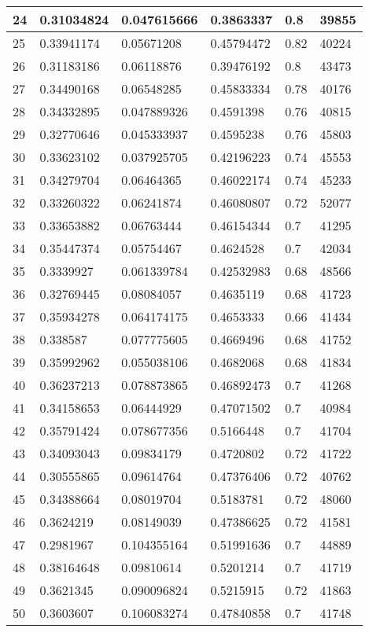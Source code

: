 \begin{longtable}{|l|l|l|l|l|l|}
24 & 0.31034824 & 0.047615666 & 0.3863337 & 0.8 & 39855 \\ \hline 
25 & 0.33941174 & 0.05671208 & 0.45794472 & 0.82 & 40224 \\ \hline 
26 & 0.31183186 & 0.06118876 & 0.39476192 & 0.8 & 43473 \\ \hline 
27 & 0.34490168 & 0.06548285 & 0.45833334 & 0.78 & 40176 \\ \hline 
28 & 0.34332895 & 0.047889326 & 0.4591398 & 0.76 & 40815 \\ \hline 
29 & 0.32770646 & 0.045333937 & 0.4595238 & 0.76 & 45803 \\ \hline 
30 & 0.33623102 & 0.037925705 & 0.42196223 & 0.74 & 45553 \\ \hline 
31 & 0.34279704 & 0.06464365 & 0.46022174 & 0.74 & 45233 \\ \hline 
32 & 0.33260322 & 0.06241874 & 0.46080807 & 0.72 & 52077 \\ \hline 
33 & 0.33653882 & 0.06763444 & 0.46154344 & 0.7 & 41295 \\ \hline 
34 & 0.35447374 & 0.05754467 & 0.4624528 & 0.7 & 42034 \\ \hline 
35 & 0.3339927 & 0.061339784 & 0.42532983 & 0.68 & 48566 \\ \hline 
36 & 0.32769445 & 0.08084057 & 0.4635119 & 0.68 & 41723 \\ \hline 
37 & 0.35934278 & 0.064174175 & 0.4653333 & 0.66 & 41434 \\ \hline 
38 & 0.338587 & 0.077775605 & 0.4669496 & 0.68 & 41752 \\ \hline 
39 & 0.35992962 & 0.055038106 & 0.4682068 & 0.68 & 41834 \\ \hline 
40 & 0.36237213 & 0.078873865 & 0.46892473 & 0.7 & 41268 \\ \hline 
41 & 0.34158653 & 0.06444929 & 0.47071502 & 0.7 & 40984 \\ \hline 
42 & 0.35791424 & 0.078677356 & 0.5166448 & 0.7 & 41704 \\ \hline 
43 & 0.34093043 & 0.09834179 & 0.4720802 & 0.72 & 41722 \\ \hline 
44 & 0.30555865 & 0.09614764 & 0.47376406 & 0.72 & 40762 \\ \hline 
45 & 0.34388664 & 0.08019704 & 0.5183781 & 0.72 & 48060 \\ \hline 
46 & 0.3624219 & 0.08149039 & 0.47386625 & 0.72 & 41581 \\ \hline 
47 & 0.2981967 & 0.104355164 & 0.51991636 & 0.7 & 44889 \\ \hline 
48 & 0.38164648 & 0.09810614 & 0.5201214 & 0.7 & 41719 \\ \hline 
49 & 0.3621345 & 0.090096824 & 0.5215915 & 0.72 & 41863 \\ \hline 
50 & 0.3603607 & 0.106083274 & 0.47840858 & 0.7 & 41748 \\ \hline 
\end{longtable}